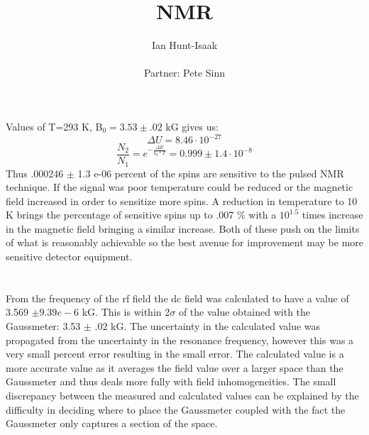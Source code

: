 \documentclass[11pt,letterpaper]{article}
\title{NMR}
\author{Ian Hunt-Isaak\\ \begin{small}
Partner: Pete Sinn
\end{small}}
\begin{document}
\date{}
\maketitle
\section{} %

Values of T=293 K, B$_0=3.53\pm .02$ kG gives us:
\begin{equation}
\Delta U = 8.46\cdot 10^{-27}
\end{equation}
\begin{equation}
\frac{N_2}{N_1} = e^{-\frac{\Delta E}{k_b * T}}=0.999 \pm 1.4\cdot 10^{-8}
\end{equation}
Thus .000246 $\pm$ 1.3 e-06 percent of the spins are sensitive to the pulsed NMR technique. If the signal was poor temperature could be reduced or the magnetic field increased in order to sensitize more spins. A reduction in temperature to 10 K brings the percentage of sensitive spins up to .007 \% with a $10^{1.5}$ times increase in the magnetic field bringing a similar increase. Both of these push on the limits of what is reasonably achievable so the best avenue for improvement may be more sensitive detector equipment. 
\section{} %
From the frequency of the rf field the dc field was calculated to have a value of 3.569 $\pm 9.39e-6$ kG. This is within 2$\sigma$ of the value obtained with the Gaussmeter: 3.53 $\pm$ .02 kG. The uncertainty in the calculated value was propagated from the uncertainty in the resonance frequency, however this was a very small percent error resulting in the small error. The calculated value is a more accurate value as it averages the field value over a larger space than the Gaussmeter and thus deals more fully with field inhomogeneities. The small discrepancy between the measured and calculated values can be explained by the difficulty in deciding where to place the Gaussmeter coupled with the fact the Gaussmeter only captures a section of the space.
\end{document}
